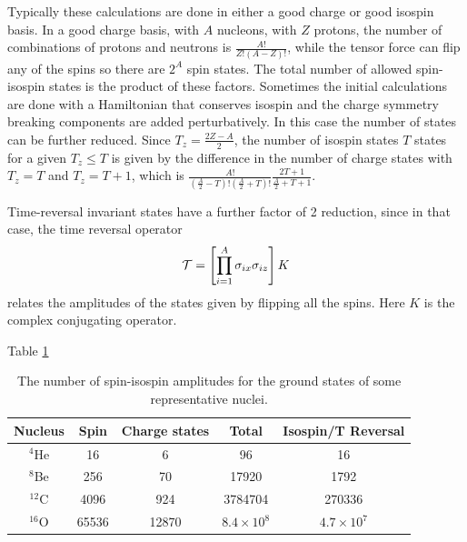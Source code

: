  Typically these calculations are done in either a good charge or good
 isospin basis. In a good charge basis, with $A$ nucleons, with $Z$ protons,
 the number of combinations of protons and neutrons is $\frac{A!}{Z!(A-Z)!}$,
 while the tensor force can flip any of the spins so there are $2^A$ spin
 states. The total number of allowed spin-isospin states is
 the product of these factors. Sometimes the initial calculations are done
 with a Hamiltonian that conserves isospin and the charge symmetry breaking
 components are added perturbatively. In this case the number of states
 can be further reduced. Since $T_z = \frac{2Z-A}{2}$, the number of
 isospin states $T$ states for a given $T_z \le T$
 is given by the difference in the number
 of charge states with $T_z=T$ and $T_z=T+1$, which is
 $\frac{A!}{(\frac{A}{2}-T)!(\frac{A}{2}+T)!}\frac{2T+1}{\frac{A}{2}+T+1}$.
 
 Time-reversal invariant states have a further factor of 2 reduction, since
 in that case, the time reversal operator
 \begin{equation}
 {\cal T} = \left [ \prod_{i=1}^A \sigma_{ix}\sigma_{iz}\right ] K
 \end{equation}
 relates the amplitudes of the states given by flipping all the spins.
 Here $K$ is the complex conjugating operator.
 
 Table \ref{chapter9.t1}
 \begin{table}
 	\begin{center}
 	\begin{tabular}{|c|c|c|c|c|}
 		\hline
 		Nucleus & Spin & Charge states & Total & Isospin/T Reversal\\
 		\hline
 		$^4$He & 16 & 6 & 96 & 16\\
 		$^8$Be & 256 & 70 & 17920 & 1792 \\
 		$^{12}$C & 4096 & 924 & 3784704 & 270336 \\
 		$^{16}$O & 65536 & 12870 & $8.4 \times 10^8$ & $4.7 \times 10^7$ \\
 		\hline
 	\end{tabular}
 	\end{center}
 	\caption{The number of spin-isospin amplitudes for the
 		ground states of some representative
 		nuclei.}
 	\label{chapter9.t1}
 \end{table}
 
